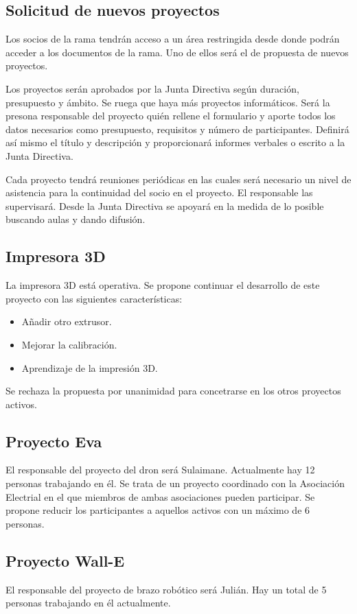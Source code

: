 \documentclass[12pt,twoside,openany,a4paper]{book}
\begin{document}
    \subsection{Solicitud de nuevos proyectos}
    Los socios de la rama tendrán acceso a un área restringida desde donde podrán acceder a los documentos de la rama. Uno de ellos será el de propuesta de nuevos proyectos.

    Los proyectos serán aprobados por la Junta Directiva según duración, presupuesto y ámbito. Se ruega que haya más proyectos informáticos. Será la presona responsable del proyecto quién rellene el formulario y aporte todos los datos necesarios como presupuesto, requisitos y número de participantes. Definirá así mismo el título y descripción y proporcionará informes verbales o escrito a la Junta Directiva.

    Cada proyecto tendrá reuniones periódicas en las cuales será necesario un nivel de asistencia para la continuidad del socio en el proyecto. El responsable las supervisará. Desde la Junta Directiva se apoyará en la medida de lo posible buscando aulas y dando difusión.

    \subsection{Impresora 3D}
    La impresora 3D está operativa. Se propone continuar el desarrollo de este proyecto con las siguientes características:
    \begin{itemize}
        \item Añadir otro extrusor.
        \item Mejorar la calibración.
        \item Aprendizaje de la impresión 3D.
    \end{itemize}

    Se rechaza la propuesta por unanimidad para concetrarse en los otros proyectos activos.

    \subsection{Proyecto Eva}
    El responsable del proyecto del dron será Sulaimane. Actualmente hay 12 personas trabajando en él. Se trata de un proyecto coordinado con la Asociación Electrial en el que miembros de ambas asociaciones pueden participar. Se propone reducir los participantes a aquellos activos con un máximo de 6 personas.

    \subsection{Proyecto Wall-E}
    El responsable del proyecto de brazo robótico será Julián. Hay un total de 5 personas trabajando en él actualmente.
\end{document}
